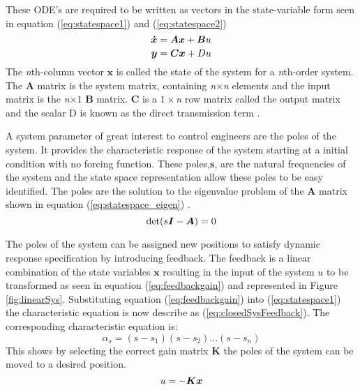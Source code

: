 These ODE's are required to be written as vectors in the state-variable form seen in equation (\ref{eq:statespace1}) and (\ref{eq:statespace2})
\begin{equation} \label{eq:statespace1}
\centering
\boldsymbol{\dot{x}} = \boldsymbol{A}\boldsymbol{x} + \boldsymbol{B}u
\end{equation}
\begin{equation} \label{eq:statespace2}
\centering
\boldsymbol{y} = \boldsymbol{C}\boldsymbol{x} + Du
\end{equation}
The \textit{n}th-column vector $\boldsymbol{x}$ is called the state of the system for a \textit{n}th-order system. The \textbf{A} matrix is the system matrix, containing \textit{n}$\times$\textit{n} elements and the input matrix is the \textit{n}$\times 1$ \textbf{B} matrix. \textbf{C} is a $1\times$\textit{n} row matrix called the output matrix and the scalar D is known as the direct transmission term \cite{textbook}.

A system parameter of great interest to control engineers are the poles of the system. It provides the characteristic response of the system starting at a initial condition with no forcing function. These poles,\textbf{s}, are the natural frequencies of the system and the state space representation allow these poles to be easy identified. The poles are the solution to the eigenvalue problem of the \textbf{A} matrix shown in equation (\ref{eq:statespace_eigen}) \cite{textbook}.
\begin{equation} \label{eq:statespace_eigen}
\centering
\text{det}(s\boldsymbol{I} - \boldsymbol{A}) = 0
\end{equation}

The poles of the system can be assigned new positions to satisfy dynamic response specification by introducing feedback. The feedback is a linear combination of the state variables $\boldsymbol{x}$ resulting in the input of the system $u$ to be transformed as seen in equation (\ref{eq:feedbackgain}) and represented in Figure \ref{fig:linearSys}. Substituting equation (\ref{eq:feedbackgain}) into (\ref{eq:statespace1}) the characteristic equation is now describe as (\ref{eq:closedSysFeedback}). The corresponding characteristic equation is: $$\alpha_{s}=(s-s_{1})(s-s_{2})\ldots(s-s_{n}) $$ This shows by selecting the correct gain matrix \textbf{K} the poles of the system can be moved to a desired position.
\begin{equation} \label{eq:feedbackgain}
\centering
u = -\boldsymbol{K}\boldsymbol{x}
\end{equation}

